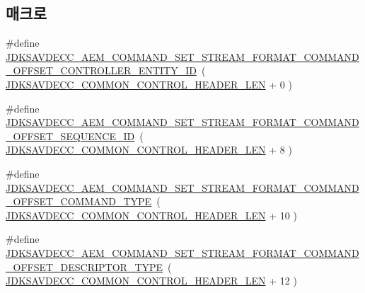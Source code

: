 \subsection*{매크로}
\begin{DoxyCompactItemize}
\item 
\#define \hyperlink{group__command__set__stream__format_ga23bdbfcb235b5c6ec55adcad535c5abf}{J\+D\+K\+S\+A\+V\+D\+E\+C\+C\+\_\+\+A\+E\+M\+\_\+\+C\+O\+M\+M\+A\+N\+D\+\_\+\+S\+E\+T\+\_\+\+S\+T\+R\+E\+A\+M\+\_\+\+F\+O\+R\+M\+A\+T\+\_\+\+C\+O\+M\+M\+A\+N\+D\+\_\+\+O\+F\+F\+S\+E\+T\+\_\+\+C\+O\+N\+T\+R\+O\+L\+L\+E\+R\+\_\+\+E\+N\+T\+I\+T\+Y\+\_\+\+ID}~( \hyperlink{group__jdksavdecc__avtp__common__control__header_gaae84052886fb1bb42f3bc5f85b741dff}{J\+D\+K\+S\+A\+V\+D\+E\+C\+C\+\_\+\+C\+O\+M\+M\+O\+N\+\_\+\+C\+O\+N\+T\+R\+O\+L\+\_\+\+H\+E\+A\+D\+E\+R\+\_\+\+L\+EN} + 0 )
\item 
\#define \hyperlink{group__command__set__stream__format_gaaecf4a28cef50d16d5a86af91711e7e7}{J\+D\+K\+S\+A\+V\+D\+E\+C\+C\+\_\+\+A\+E\+M\+\_\+\+C\+O\+M\+M\+A\+N\+D\+\_\+\+S\+E\+T\+\_\+\+S\+T\+R\+E\+A\+M\+\_\+\+F\+O\+R\+M\+A\+T\+\_\+\+C\+O\+M\+M\+A\+N\+D\+\_\+\+O\+F\+F\+S\+E\+T\+\_\+\+S\+E\+Q\+U\+E\+N\+C\+E\+\_\+\+ID}~( \hyperlink{group__jdksavdecc__avtp__common__control__header_gaae84052886fb1bb42f3bc5f85b741dff}{J\+D\+K\+S\+A\+V\+D\+E\+C\+C\+\_\+\+C\+O\+M\+M\+O\+N\+\_\+\+C\+O\+N\+T\+R\+O\+L\+\_\+\+H\+E\+A\+D\+E\+R\+\_\+\+L\+EN} + 8 )
\item 
\#define \hyperlink{group__command__set__stream__format_gafe2607df7f2784c5b8f8517dd216e666}{J\+D\+K\+S\+A\+V\+D\+E\+C\+C\+\_\+\+A\+E\+M\+\_\+\+C\+O\+M\+M\+A\+N\+D\+\_\+\+S\+E\+T\+\_\+\+S\+T\+R\+E\+A\+M\+\_\+\+F\+O\+R\+M\+A\+T\+\_\+\+C\+O\+M\+M\+A\+N\+D\+\_\+\+O\+F\+F\+S\+E\+T\+\_\+\+C\+O\+M\+M\+A\+N\+D\+\_\+\+T\+Y\+PE}~( \hyperlink{group__jdksavdecc__avtp__common__control__header_gaae84052886fb1bb42f3bc5f85b741dff}{J\+D\+K\+S\+A\+V\+D\+E\+C\+C\+\_\+\+C\+O\+M\+M\+O\+N\+\_\+\+C\+O\+N\+T\+R\+O\+L\+\_\+\+H\+E\+A\+D\+E\+R\+\_\+\+L\+EN} + 10 )
\item 
\#define \hyperlink{group__command__set__stream__format_ga25da528fd42f5ef79193b65ef514b56c}{J\+D\+K\+S\+A\+V\+D\+E\+C\+C\+\_\+\+A\+E\+M\+\_\+\+C\+O\+M\+M\+A\+N\+D\+\_\+\+S\+E\+T\+\_\+\+S\+T\+R\+E\+A\+M\+\_\+\+F\+O\+R\+M\+A\+T\+\_\+\+C\+O\+M\+M\+A\+N\+D\+\_\+\+O\+F\+F\+S\+E\+T\+\_\+\+D\+E\+S\+C\+R\+I\+P\+T\+O\+R\+\_\+\+T\+Y\+PE}~( \hyperlink{group__jdksavdecc__avtp__common__control__header_gaae84052886fb1bb42f3bc5f85b741dff}{J\+D\+K\+S\+A\+V\+D\+E\+C\+C\+\_\+\+C\+O\+M\+M\+O\+N\+\_\+\+C\+O\+N\+T\+R\+O\+L\+\_\+\+H\+E\+A\+D\+E\+R\+\_\+\+L\+EN} + 12 )

\end{DoxyCompactItemize}
